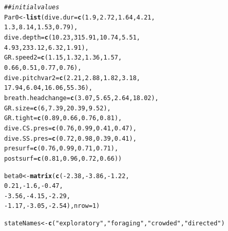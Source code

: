 \documentclass[12pt]{article}\usepackage[]{graphicx}\usepackage[]{xcolor}
\makeatletter
\newcommand{\hlnum}[1]{\textcolor[rgb]{0.686,0.059,0.569}{#1}}%
\newcommand{\hlstr}[1]{\textcolor[rgb]{0.192,0.494,0.8}{#1}}%
\newcommand{\hlcom}[1]{\textcolor[rgb]{0.678,0.584,0.686}{\textit{#1}}}%
\newcommand{\hlopt}[1]{\textcolor[rgb]{0,0,0}{#1}}%
\newcommand{\hlstd}[1]{\textcolor[rgb]{0.345,0.345,0.345}{#1}}%
\newcommand{\hlkwb}[1]{\textcolor[rgb]{0.69,0.353,0.396}{#1}}%
\newcommand{\hlkwc}[1]{\textcolor[rgb]{0.333,0.667,0.333}{#1}}%
\newcommand{\hlkwd}[1]{\textcolor[rgb]{0.737,0.353,0.396}{\textbf{#1}}}%
\newenvironment{kframe}{%
 \def\at@end@of@kframe{}%
 \ifinner\ifhmode%
  \def\at@end@of@kframe{\end{minipage}}%
  \begin{minipage}{\columnwidth}%
 \fi\fi%
 \def\FrameCommand##1{\hskip\@totalleftmargin \hskip-\fboxsep
 \colorbox{shadecolor}{##1}\hskip-\fboxsep
     \hskip-\linewidth \hskip-\@totalleftmargin \hskip\columnwidth}%
 \MakeFramed {\advance\hsize-\width
   \@totalleftmargin\z@ \linewidth\hsize
   \@setminipage}}%
 {\par\unskip\endMakeFramed%
 \at@end@of@kframe}
\newenvironment{knitrout}{}{} %
\makeatother
\begin{document}
\begin{knitrout}
\begin{kframe}
\begin{alltt}
\hlcom{## initial values}
\hlstd{Par0} \hlkwb{<-} \hlkwd{list}\hlstd{(}\hlkwc{dive.dur} \hlstd{=} \hlkwd{c}\hlstd{(}\hlnum{1.9}\hlstd{,} \hlnum{2.72}\hlstd{,} \hlnum{1.64}\hlstd{,} \hlnum{4.21}\hlstd{,}
                          \hlnum{1.3}\hlstd{,} \hlnum{8.14}\hlstd{,} \hlnum{1.53}\hlstd{,} \hlnum{0.79}\hlstd{),}
             \hlkwc{dive.depth} \hlstd{=} \hlkwd{c}\hlstd{(}\hlnum{10.23}\hlstd{,} \hlnum{315.91}\hlstd{,} \hlnum{10.74}\hlstd{,} \hlnum{5.51}\hlstd{,}
                             \hlnum{4.93}\hlstd{,} \hlnum{233.12}\hlstd{,}  \hlnum{6.32}\hlstd{,} \hlnum{1.91}\hlstd{),}
             \hlkwc{GR.speed2} \hlstd{=} \hlkwd{c}\hlstd{(}\hlnum{1.15}\hlstd{,} \hlnum{1.32}\hlstd{,} \hlnum{1.36}\hlstd{,} \hlnum{1.57}\hlstd{,}
                           \hlnum{0.66}\hlstd{,} \hlnum{0.51}\hlstd{,} \hlnum{0.77}\hlstd{,} \hlnum{0.76}\hlstd{),}
             \hlkwc{dive.pitchvar2} \hlstd{=} \hlkwd{c}\hlstd{(} \hlnum{2.21}\hlstd{,} \hlnum{2.88}\hlstd{,}  \hlnum{1.82}\hlstd{,}  \hlnum{3.18}\hlstd{,}
                                \hlnum{17.94}\hlstd{,} \hlnum{6.04}\hlstd{,} \hlnum{16.06}\hlstd{,} \hlnum{55.36}\hlstd{),}
             \hlkwc{breath.headchange} \hlstd{=} \hlkwd{c}\hlstd{(}\hlnum{3.07}\hlstd{,} \hlnum{5.65}\hlstd{,} \hlnum{2.64}\hlstd{,} \hlnum{18.02}\hlstd{),}
             \hlkwc{GR.size} \hlstd{=} \hlkwd{c}\hlstd{(}\hlnum{6}\hlstd{,} \hlnum{7.39}\hlstd{,} \hlnum{20.39}\hlstd{,} \hlnum{9.52}\hlstd{),}
             \hlkwc{GR.tight} \hlstd{=} \hlkwd{c}\hlstd{(}\hlnum{0.89}\hlstd{,} \hlnum{0.66}\hlstd{,} \hlnum{0.76}\hlstd{,} \hlnum{0.81}\hlstd{),}
             \hlkwc{dive.CS.pres} \hlstd{=} \hlkwd{c}\hlstd{(}\hlnum{0.76}\hlstd{,} \hlnum{0.99}\hlstd{,} \hlnum{0.41}\hlstd{,} \hlnum{0.47}\hlstd{),}
             \hlkwc{dive.SS.pres} \hlstd{=} \hlkwd{c}\hlstd{(}\hlnum{0.72}\hlstd{,} \hlnum{0.98}\hlstd{,} \hlnum{0.39}\hlstd{,} \hlnum{0.41}\hlstd{),}
             \hlkwc{presurf} \hlstd{=} \hlkwd{c}\hlstd{(}\hlnum{0.76}\hlstd{,} \hlnum{0.99}\hlstd{,} \hlnum{0.71}\hlstd{,} \hlnum{0.71}\hlstd{),}
             \hlkwc{postsurf} \hlstd{=} \hlkwd{c}\hlstd{(}\hlnum{0.81}\hlstd{,} \hlnum{0.96}\hlstd{,} \hlnum{0.72}\hlstd{,} \hlnum{0.66}\hlstd{))}

\hlstd{beta0} \hlkwb{<-} \hlkwd{matrix}\hlstd{(}\hlkwd{c}\hlstd{(}\hlopt{-}\hlnum{2.38}\hlstd{,} \hlopt{-}\hlnum{3.86}\hlstd{,} \hlopt{-}\hlnum{1.22}\hlstd{,}
                   \hlnum{0.21}\hlstd{,}  \hlopt{-}\hlnum{1.6}\hlstd{,} \hlopt{-}\hlnum{0.47}\hlstd{,}
                  \hlopt{-}\hlnum{3.56}\hlstd{,} \hlopt{-}\hlnum{4.15}\hlstd{,} \hlopt{-}\hlnum{2.29}\hlstd{,}
                  \hlopt{-}\hlnum{1.17}\hlstd{,} \hlopt{-}\hlnum{3.05}\hlstd{,} \hlopt{-}\hlnum{2.54}\hlstd{),}\hlkwc{nrow}\hlstd{=}\hlnum{1}\hlstd{)}

\hlstd{stateNames} \hlkwb{<-} \hlkwd{c}\hlstd{(}\hlstr{"exploratory"}\hlstd{,}\hlstr{"foraging"}\hlstd{,}\hlstr{"crowded"}\hlstd{,}\hlstr{"directed"}\hlstd{)}
\end{alltt}
\end{kframe}
\end{knitrout}
\end{document}
